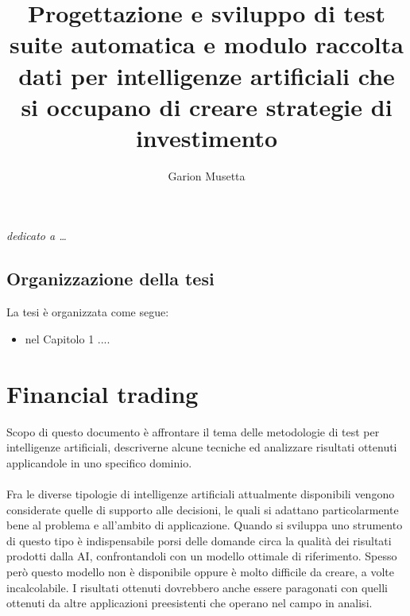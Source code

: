 \documentclass[a4paper,12pt]{report}
\begin{document}
\title{Progettazione e sviluppo di test suite automatica e modulo raccolta dati per intelligenze artificiali che si occupano di creare strategie di investimento}
\author{Garion Musetta}
%
% 
%
\beforepreface
\prefacesection{}
        {\hfill \Large {\sl dedicato a \dots}}
% 
%

%
%
\section*{Organizzazione della tesi}
\label{organizzazione}
La tesi \`e organizzata come segue:
\begin{itemize}
\item nel Capitolo 1 ....
\end{itemize}
%
%

\afterpreface
% 
% 
%
%


\chapter{Financial trading}
\label{cap1}
Scopo di questo documento è affrontare il tema delle metodologie di test per intelligenze artificiali, descriverne alcune tecniche ed analizzare risultati ottenuti applicandole in uno specifico dominio.
\\~\\
Fra le diverse tipologie di intelligenze artificiali attualmente disponibili vengono considerate quelle di supporto alle decisioni, le quali si adattano particolarmente bene al problema e all'ambito di applicazione. Quando si sviluppa uno strumento di questo tipo è indispensabile porsi delle domande circa la qualità dei risultati prodotti dalla AI, confrontandoli con un modello ottimale di riferimento. Spesso però questo modello non è disponibile oppure è molto difficile da creare, a volte incalcolabile. I risultati ottenuti dovrebbero anche essere paragonati con quelli ottenuti da altre applicazioni preesistenti che operano nel campo in analisi.
\end{document}
